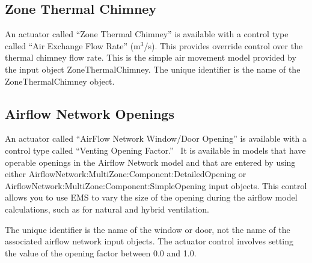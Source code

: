 \subsection{Zone Thermal Chimney}\label{zone-thermal-chimney}

An actuator called ``Zone Thermal Chimney'' is available with a control type called ``Air Exchange Flow Rate'' (m\(^{3}\)/s). This provides override control over the thermal chimney flow rate. This is the simple air movement model provided by the input object ZoneThermalChimney. The unique identifier is the name of the ZoneThermalChimney object.

\subsection{Airflow Network Openings}\label{airflow-network-openings}

An actuator called ``AirFlow Network Window/Door Opening'' is available with a control type called ``Venting Opening Factor.''~ It is available in models that have operable openings in the Airflow Network model and that are entered by using either AirflowNetwork:MultiZone:Component:DetailedOpening or AirflowNetwork:MultiZone:Component:SimpleOpening input objects. This control allows you to use EMS to vary the size of the opening during the airflow model calculations, such as for natural and hybrid ventilation.

The unique identifier is the name of the window or door, not the name of the associated airflow network input objects. The actuator control involves setting the value of the opening factor between 0.0 and 1.0.
